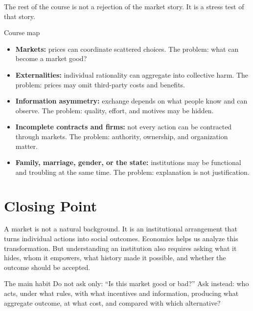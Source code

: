 \documentclass[10pt,a4paper]{article}
\begin{document}
The rest of the course is not a rejection of the market story. It is a stress test of that story.

\begin{keybox}{Course map}
\begin{itemize}
  \item \textbf{Markets:} prices can coordinate scattered choices. The problem: what can become a market good?
  \item \textbf{Externalities:} individual rationality can aggregate into collective harm. The problem: prices may omit third-party costs and benefits.
  \item \textbf{Information asymmetry:} exchange depends on what people know and can observe. The problem: quality, effort, and motives may be hidden.
  \item \textbf{Incomplete contracts and firms:} not every action can be contracted through markets. The problem: authority, ownership, and organization matter.
  \item \textbf{Family, marriage, gender, or the state:} institutions may be functional and troubling at the same time. The problem: explanation is not justification.
\end{itemize}
\end{keybox}

\section{Closing Point}

A market is not a natural background. It is an institutional arrangement that turns individual actions into social outcomes. Economics helps us analyze this transformation. But understanding an institution also requires asking what it hides, whom it empowers, what history made it possible, and whether the outcome should be accepted.

\begin{insightbox}{The main habit}
Do not ask only: ``Is this market good or bad?'' Ask instead: who acts, under what rules, with what incentives and information, producing what aggregate outcome, at what cost, and compared with which alternative?
\end{insightbox}
\end{document}
